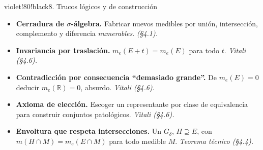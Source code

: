 \documentclass[11pt,twoside]{article}
\newcommand{\R}{\mathbb{R}}
\begin{document}
\begin{equivbox}{violet!80!black}{8. Trucos l\'ogicos y de construcci\'on}
\begin{itemize}[leftmargin=2em,itemsep=2pt]
\item \textbf{Cerradura de $\sigma$-\'algebra.} Fabricar nuevos medibles por uni\'on, intersecci\'on, complemento y diferencia \emph{numerables}. \hfill\textit{(§4.1).}
\item \textbf{Invariancia por traslaci\'on.} $m_{e}(E + t) = m_{e}(E)$ para todo $t$. \hfill\textit{Vitali (§4.6).}
\item \textbf{Contradicci\'on por consecuencia ``demasiado grande''.} De $m_{e}(E) = 0$ deducir $m_{e}(\R) = 0$, absurdo. \hfill\textit{Vitali (§4.6).}
\item \textbf{Axioma de elecci\'on.} Escoger un representante por clase de equivalencia para construir conjuntos patol\'ogicos. \hfill\textit{Vitali (§4.6).}
\item \textbf{Envoltura que respeta intersecciones.} Un $G_{\delta}$, $H \supseteq E$, con $m(H \cap M) = m_{e}(E \cap M)$ para todo medible $M$. \hfill\textit{Teorema t\'ecnico (§4.4).}
\end{itemize}
\end{equivbox}

\end{document}
